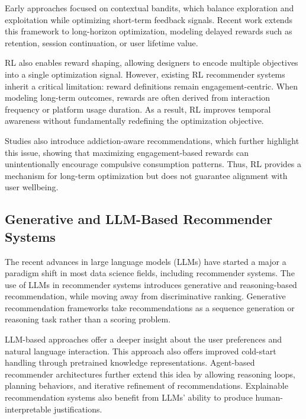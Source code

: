 Early approaches focused on contextual bandits, which balance exploration
and exploitation while optimizing short-term feedback signals.
Recent work extends this framework to long-horizon optimization, modeling delayed
rewards such as retention, session continuation, or user lifetime value.
\cite{Rastogi2025MultiScaleCB}

RL also enables reward shaping, allowing designers to encode
multiple objectives into a single optimization signal.
However, existing RL recommender systems inherit a critical 
limitation: reward definitions remain engagement-centric.
When modeling long-term outcomes, rewards are often derived 
from interaction frequency or platform usage duration.
As a result, RL improves temporal awareness without 
fundamentally redefining the optimization objective.
\cite{Bolis2025BalancingBA,Anwar2024RecommendationAT}

Studies also introduce addiction-aware recommendations, which further highlight 
this issue, showing that maximizing engagement-based rewards can unintentionally
encourage compulsive consumption patterns.
Thus, RL provides a mechanism for long-term optimization 
but does not guarantee alignment with user wellbeing.
\cite{Bolis2025BalancingBA,xia2026llmenhancedreinforcementlearninglongterm,Anwar2024RecommendationAT}


\subsection{Generative and LLM-Based Recommender Systems}

The recent advances in large language models (LLMs) have started a major a paradigm 
shift in most data science fields, including recommender systems.
The use of LLMs in recommender systems introduces generative and reasoning-based
recommendation, while moving away from discriminative ranking.
\cite{yu2026thinkrecthinkingbasedrecommendationllm}
Generative recommendation frameworks take recommendations as a 
sequence generation or reasoning task rather than a scoring problem.
\cite{hou2025surveygenerativerecommendationdata}

LLM-based approaches offer a deeper insight about the 
user preferences and natural language interaction. 
This approach also offers improved cold-start handling 
through pretrained knowledge representations.
\cite{202512.0741}
Agent-based recommender architectures further extend this idea by allowing 
reasoning loops, planning behaviors, and iterative refinement of recommendations.
\cite{zhang2023agentcfcollaborativelearningautonomous,shang2025agentrecbenchbenchmarkingllmagentbased}
Explainable recommendation systems also benefit from LLMs'
ability to produce human-interpretable justifications.
\cite{park2026more}



